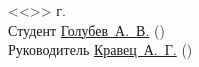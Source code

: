 \documentclass[a4paper, 14pt]{extreport}
\begin{document}
    \pagestyle{empty}
    \vspace{\fill}
    \noindent<<\underline{\hspace{1cm}}>> \underline{\hspace{5cm}} \the\year г.\\
    Студент \hspace{1cm} \underline{Голубев~А.~В.\hspace{3.2cm}} \hspace{2cm} (\underline{\hspace{5cm}})\\
    Руководитель \underline{Кравец~А.~Г.\hspace{3.45cm}} \hspace{2cm} (\underline{\hspace{5cm}})\\
\end{document}
